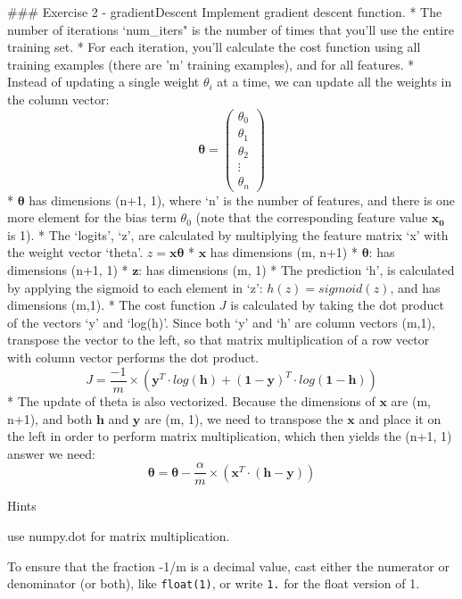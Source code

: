 \documentclass[11pt]{article}
\begin{document}
    \#\#\# Exercise 2 - gradientDescent Implement gradient descent function.
* The number of iterations `num\_iters" is the number of times that
you'll use the entire training set. * For each iteration, you'll
calculate the cost function using all training examples (there are 'm'
training examples), and for all features. * Instead of updating a single
weight \(\theta_i\) at a time, we can update all the weights in the
column vector:\\
\[\mathbf{\theta} = \begin{pmatrix}
\theta_0
\\
\theta_1
\\ 
\theta_2 
\\ 
\vdots
\\ 
\theta_n
\end{pmatrix}\] * \(\mathbf{\theta}\) has dimensions (n+1, 1), where `n'
is the number of features, and there is one more element for the bias
term \(\theta_0\) (note that the corresponding feature value
\(\mathbf{x_0}\) is 1). * The `logits', `z', are calculated by
multiplying the feature matrix `x' with the weight vector `theta'.
\(z = \mathbf{x}\mathbf{\theta}\) * \(\mathbf{x}\) has dimensions (m,
n+1) * \(\mathbf{\theta}\): has dimensions (n+1, 1) * \(\mathbf{z}\):
has dimensions (m, 1) * The prediction `h', is calculated by applying
the sigmoid to each element in `z': \(h(z) = sigmoid(z)\), and has
dimensions (m,1). * The cost function \(J\) is calculated by taking the
dot product of the vectors `y' and `log(h)'. Since both `y' and `h' are
column vectors (m,1), transpose the vector to the left, so that matrix
multiplication of a row vector with column vector performs the dot
product.
\[J = \frac{-1}{m} \times \left(\mathbf{y}^T \cdot log(\mathbf{h}) + \mathbf{(1-y)}^T \cdot log(\mathbf{1-h}) \right)\]
* The update of theta is also vectorized. Because the dimensions of
\(\mathbf{x}\) are (m, n+1), and both \(\mathbf{h}\) and \(\mathbf{y}\)
are (m, 1), we need to transpose the \(\mathbf{x}\) and place it on the
left in order to perform matrix multiplication, which then yields the
(n+1, 1) answer we need:
\[\mathbf{\theta} = \mathbf{\theta} - \frac{\alpha}{m} \times \left( \mathbf{x}^T \cdot \left( \mathbf{h-y} \right) \right)\]

    Hints

use numpy.dot for matrix multiplication.

To ensure that the fraction -1/m is a decimal value, cast either the
numerator or denominator (or both), like \texttt{float(1)}, or write
\texttt{1.} for the float version of 1.
\end{document}
